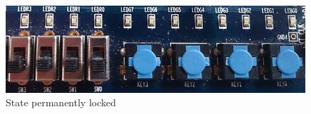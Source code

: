 \begin{enumerate}
\begin{figure}[h]
	\centering
	\includegraphics[scale=0.5]{pictures/Oevelse7/opg2/StatePermLocked.JPG}
	\caption{State permanently locked}
	\label{fig:}
\end{figure}

\end{enumerate}
	